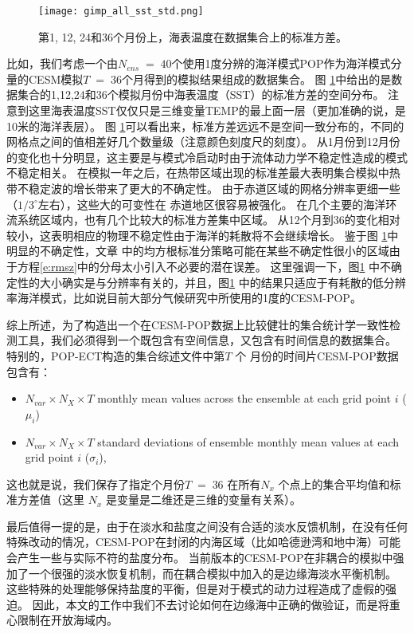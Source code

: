 \begin {figure} 
\centering
\texttt{[image: gimp\_all\_sst\_std.png]}
\caption{第1, 12, 24和36个月份上，海表温度在数据集合上的标准方差。}
\label{fig:SST_STD_all}
\end {figure}

比如，我们考虑一个由$N_{ens} \;=\; 40$个使用1度分辨的海洋模式POP作为海洋模式分量的CESM模拟$T\;=\;36$个月得到的模拟结果组成的数据集合。 
图 \ref{fig:SST_STD_all}中给出的是数据集合的1,12,24和36个模拟月份中海表温度（SST）的标准方差的空间分布。
注意到这里海表温度SST仅仅只是三维变量TEMP的最上面一层（更加准确的说，是10米的海洋表层）。
图 \ref{fig:SST_STD_all}可以看出来，标准方差远远不是空间一致分布的，不同的网格点之间的值相差好几个数量级（注意颜色刻度尺的刻度）。 
从1月份到12月份的变化也十分明显，这主要是与模式冷启动时由于流体动力学不稳定性造成的模式不稳定相关。  
在模拟一年之后，在热带区域出现的标准差最大表明集合模拟中热带不稳定波的增长带来了更大的不确定性\cite{legeckis1977}。
由于赤道区域的网格分辨率更细一些（$1/3^\circ$左右），这些大的可变性在 赤道地区很容易被强化。 
在几个主要的海洋环流系统区域内，也有几个比较大的标准方差集中区域。
从12个月到36的变化相对较小，这表明相应的物理不稳定性由于海洋的耗散将不会继续增长。
鉴于图 \ref{fig:SST_STD_all}中明显的不确定性，文章\cite{yong2015} 中的均方根标准分策略可能在某些不确定性很小的区域由于方程\ref{e:rmsz}中的分母太小引入不必要的潜在误差。
这里强调一下，图\ref{fig:SST_STD_all} 中不确定性的大小确实是与分辨率有关的，并且，图\ref{fig:SST_STD_all} 中的结果只适应于有耗散的低分辨率海洋模式，比如说目前大部分气候研究中所使用的1度的CESM-POP。


 
综上所述，为了构造出一个在CESM-POP数据上比较健壮的集合统计学一致性检测工具，我们必须得到一个既包含有空间信息，又包含有时间信息的数据集合。
特别的，POP-ECT构造的集合综述文件中第$T$ 个 月份的时间片CESM-POP数据包含有：
\begin{itemize}
 \item $N_{var} \times N_X \times T$  monthly mean values across the ensemble at each grid point $i$ ($\mu_i$)
 \item $N_{var} \times N_X \times T$ standard deviations of ensemble monthly mean values at each grid point $i$ ($\sigma_i$),
 \end{itemize}
 这也就是说，我们保存了指定个月份$T \;=\; 36$ 在所有$N_x$ 个点上的集合平均值和标准方差值（这里 $N_x$ 是变量是二维还是三维的变量有关系）。
 

 最后值得一提的是，由于在淡水和盐度之间没有合适的淡水反馈机制，在没有任何特殊改动的情况，CESM-POP在封闭的内海区域（比如哈德逊湾和地中海）可能会产生一些与实际不符的盐度分布。
当前版本的CESM-POP在非耦合的模拟中强加了一个很强的淡水恢复机制，而在耦合模拟中加入的是边缘海淡水平衡机制。
这些特殊的处理能够保持盐度的平衡，但是对于模式的动力过程造成了虚假的强迫。
因此，本文的工作中我们不去讨论如何在边缘海中正确的做验证，而是将重心限制在开放海域内。


